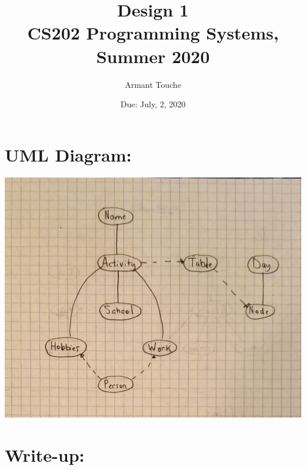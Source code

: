 \documentclass[11pt, a4paper]{article}
\title{\bf Design 1\\[1ex]
\rm\normalsize CS202 Programming Systems, Summer 2020 }
\date{\normalsize Due: July, 2, 2020}
\author{\normalsize Armant Touche}
\begin{document}
\vspace{0cm}\maketitle 

\section*{UML Diagram:}


            \begin{center}
            \includegraphics[width=.5\textwidth]{uml1}
            \end{center}

\section*{Write-up:}
\end{document}
